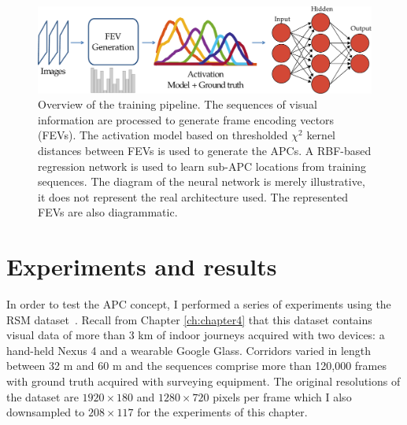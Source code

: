 \begin{figure}[h]
\centering
\includegraphics[width=\linewidth]{gfx/Chapter05/nn_pipelineFEV.pdf}
\caption{Overview of the training pipeline. The sequences of visual information are processed to generate frame encoding vectors (FEVs). The activation model based on thresholded $\chi^2$ kernel distances between FEVs is used to generate the APCs. A RBF-based regression network is used to learn sub-APC locations from training sequences. The diagram of the neural network is merely illustrative, it does not represent the real architecture used. The represented FEVs are also diagrammatic.}
\label{fig:pipeline}
\end{figure}




\section{Experiments and results}
\label{sec:ch5experiments}

In order to test the APC concept, I performed a series of experiments using the RSM dataset~\cite{RiveraWearable}. Recall from Chapter \ref{ch:chapter4} that this dataset contains visual data of more than 3 km of indoor journeys acquired with two devices: a hand-held Nexus 4 and a wearable Google Glass. Corridors varied in length between 32 m and 60 m and the sequences comprise more than 120,000 frames with ground truth acquired with surveying equipment. The original resolutions of the dataset are $1920\times 180$  and $1280 \times 720$ pixels per frame which I also downsampled to $208 \times 117$ for the experiments of this chapter. 



